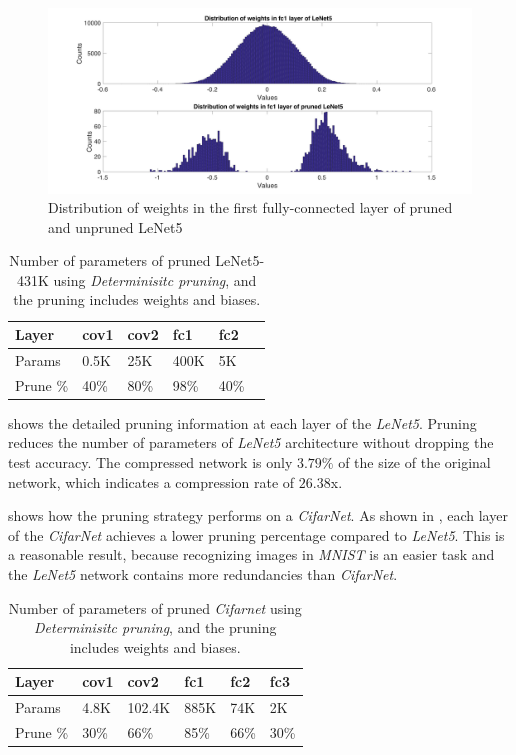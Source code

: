 \documentclass[a4paper,12pt]{report}
\begin{document}
\begin{figure}[!h]
  \includegraphics[width=\textwidth]{distr_weights.pdf}
  \caption{Distribution of weights in the first fully-connected layer of pruned and unpruned LeNet5}
  \label{fig:dist_weights}
\end{figure}

\begin{table}[!h]
\centering
\begin{tabular}{|l|l|l|l|l|l|}
\hline
Layer			&cov1	&cov2	&fc1	&fc2 		\\ \hline
Params		& 0.5K		&25K	&400K	&5K	\\
\hline
Prune \%	& 40\%		&80\%	&98\%	&40\%	\\
\hline
\end{tabular}
\caption{Number of parameters of pruned LeNet5-431K using \textit{Determinisitc
pruning}, and the pruning includes weights and biases.}
\label{tab:LeNetPrune}
\end{table}

 shows the detailed pruning information at each layer of
the \textit{LeNet5}.
Pruning reduces the number of parameters of
\textit{LeNet5} architecture without dropping the test accuracy.
The compressed network is only $3.79\%$ of the size of the original network,
which indicates a compression rate of $26.38$x.

 shows how the pruning strategy performs on a
\textit{CifarNet}.
As shown in , each layer of the \textit{CifarNet}
achieves a lower pruning percentage compared to \textit{LeNet5}.
This is a reasonable result, because
recognizing images in \textit{MNIST} is an easier task and the
\textit{LeNet5} network contains more redundancies than \textit{CifarNet}.

\begin{table}[!h]
\centering
\begin{tabular}{|l|l|l|l|l|l|}
\hline
Layer			&cov1	&cov2		&fc1		&fc2		&fc3		\\ \hline
Params		& 4.8K		&102.4K	&885K	&74K		&2K 	\\
\hline
Prune \%	& 30\%		&66\%	&85\%	&66\%	&30\%	 \\
\hline
\end{tabular}
\caption{Number of parameters of pruned \textit{Cifarnet} using \textit{Determinisitc
pruning}, and the pruning includes weights and biases.}
\label{tab:CifarNetPrune}
\end{table}
\end{document}

